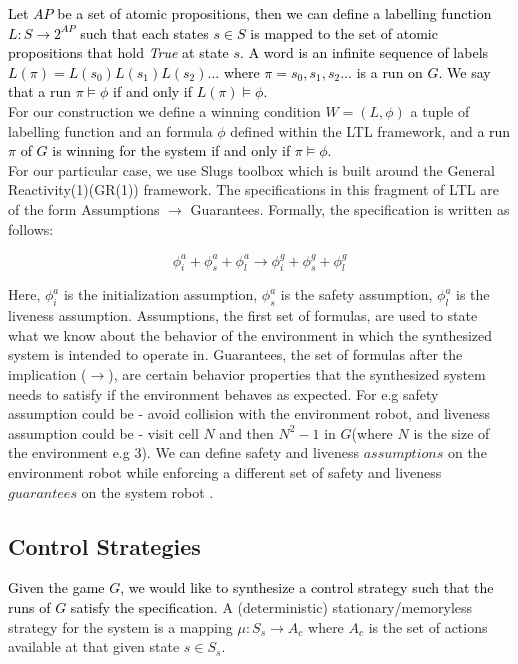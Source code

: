 \documentclass[letterpaper, 10 pt, conference]{ieeeconf}  %
\begin{document}
\textcolor{black}{Let $AP$ be a set of atomic propositions, then we can define a labelling function $L : S \rightarrow 2^{AP}$ such that each states $s \in S$ is mapped to the set of atomic propositions that hold \textit{True} at state $s$. A word is an infinite sequence of labels $L(\pi) = L(s_0)L(s_1)L(s_2)...$ where $\pi = s_0, s_1, s_2...$ is a run on $G$. We say that a run $\pi \models \phi$ if and only if $L(\pi) \models \phi$.}\\

For our construction we define a winning condition $W = (L, \phi)$ a tuple of labelling function and an formula $\phi$ defined within the LTL framework, and \textcolor{black}{ a run $\pi$ of $G$ is winning for the system if and only if $\pi \models \phi$.} \\

For our particular case, we use Slugs toolbox\cite{c2} which is built around the General Reactivity(1)(GR(1)) framework. The specifications in this fragment of LTL are of the form Assumptions $\rightarrow$ Guarantees. Formally, the specification is written as follows:

\begin{equation}
    \phi^a_i + \phi^a_s + \phi^a_l \longrightarrow  \phi^g_i + \phi^g_s + \phi^g_l
\end{equation}

Here, $\phi_i^a$ is the initialization assumption, $\phi_s^a$ is the safety assumption, $\phi_l^a$ is the liveness assumption. Assumptions, the first set of formulas, are used to state what we know about the behavior of the environment in which the synthesized system is intended to operate in. Guarantees, the set of formulas after the implication ($\rightarrow$), are certain behavior properties that the synthesized system needs to satisfy if the environment behaves as expected.  For e.g safety assumption could be - avoid collision with the environment robot, and liveness assumption could be - visit cell $N$ and then $N^2 - 1$ in $G$(where $N$ is the size of the environment e.g 3). We can define safety and liveness $assumptions$ on the environment robot while enforcing a different set of safety and liveness $guarantees$ on the system robot . 
 
\subsection{Control Strategies}

\textcolor{black} {Given the game $G$, we would like to synthesize a control strategy such that the runs of $G$ satisfy the specification.}  A (deterministic) stationary/memoryless strategy for the system is a mapping $\mu : S_s \rightarrow A_c$ where $A_c$ is the set of actions available at that given state $s \in S_s$.\\
\end{document}
